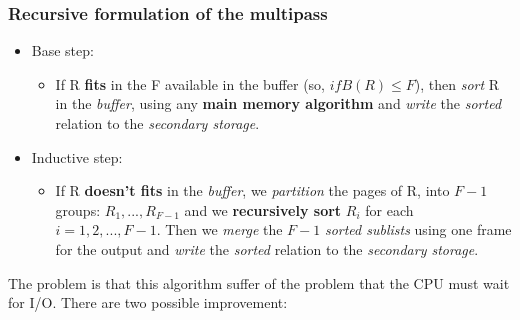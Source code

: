 \documentclass{article}
\begin{document}
\subsubsection{Recursive formulation of the multipass}
\begin{itemize}
\item Base step:
\begin{itemize}
\item If R \textbf{fits} in the F available in the buffer (so, $if B(R) \leq F$), then \emph{sort} R in the \emph{buffer}, using any \textbf{main memory algorithm} and \emph{write} the \emph{sorted} relation to the \emph{secondary storage}. 
\end{itemize}
\item Inductive step:
\begin{itemize}
\item If R \textbf{doesn't fits} in the \emph{buffer}, we \emph{partition} the pages of R, into $F-1$ groups: $R_1, ... , R_{F-1}$ and we \textbf{recursively sort} $R_i$ for each $i = 1,2,...,F-1$. Then we \emph{merge} the $F-1$ \emph{sorted sublists} using one frame for the output and \emph{write} the \emph{sorted} relation to the \emph{secondary storage}. 
\end{itemize}
\end{itemize}
The problem is that this algorithm suffer of the problem that the CPU must wait for I/O. There are two possible improvement:
\end{document}
